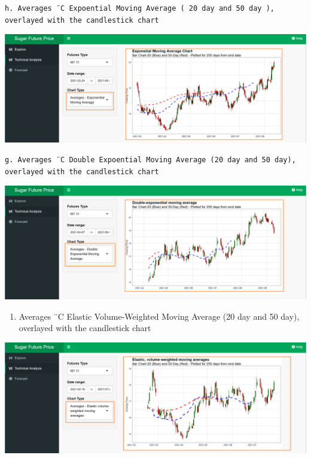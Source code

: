 \documentclass[
  12pt,
]{article}
\providecommand{\tightlist}{%
  \setlength{\itemsep}{0pt}\setlength{\parskip}{0pt}}
\begin{document}
\begin{verbatim}
h. Averages ¨C Expoential Moving Average ( 20 day and 50 day ), overlayed with the candlestick chart 
\end{verbatim}

\begin{center}\includegraphics[width=1\linewidth]{images/TA_3} \end{center}

\begin{verbatim}
g. Averages ¨C Double Expoential Moving Average (20 day and 50 day), overlayed with the candlestick chart 
\end{verbatim}

\begin{center}\includegraphics[width=1\linewidth]{images/TA_4} \end{center}

\begin{enumerate}
\def\labelenumi{\alph{enumi}.}
\setcounter{enumi}{7}
\tightlist
\item
  Averages ¨C Elastic Volume-Weighted Moving Average (20 day and 50
  day), overlayed with the candlestick chart
\end{enumerate}

\begin{center}\includegraphics[width=1\linewidth]{images/TA_5} \end{center}
\end{document}
